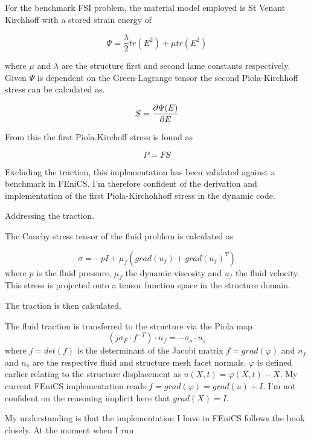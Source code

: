 \documentclass{article}
\begin{document}
For the benchmark FSI problem, the material model employed is St Venant Kirchhoff with a stored strain energy of 

\begin{equation}
\Psi = \frac{\lambda}{2} tr(E^2) + \mu tr(E^2) 
\end{equation}

where $\mu$ and $\lambda$ are the structure first and second lame constants respectively. Given $\Psi$ is dependent on the Green-Lagrange tensor the second Piola-Kirchhoff stress can be calculated as.

\begin{equation}
S = \frac{\partial \Psi (E)}{\partial E} 
\end{equation}

From this the first Piola-Kirchoff stress is found as

\begin{equation}
P = FS
\end{equation}

Excluding the traction, this implementation has been validated against a benchmark in FEniCS. I'm therefore confident of the derivation and implementation of the first Piola-Kirchohhoff stress in the dynamic code. 

Addressing the traction. 

The Cauchy stress tensor of the fluid problem is calculated as

\begin{equation}
\sigma = -p I + \mu_f (grad(u_f) + grad(u_f)^T )
\end{equation}
where $p$ is the fluid pressure, $\mu_f$ the dynamic viscosity and $u_f$ the fluid velocity. This stress is projected onto a tensor function space in the structure domain. 

The traction is then calculated.

The fluid traction is transferred to the structure via the Piola map
$$ (j \sigma_F \cdot f^{-T}) \cdot n_f = -\sigma_s \cdot n_s $$
where $j = det (f)$ is the determinant of the Jacobi matrix $f = grad(\varphi)$ and $n_f$ and $n_s$ are the respective fluid and structure mesh facet normals. $\varphi$ is defined earlier relating to the structure displacement as $u(X,t) = \varphi (X,t) - X$. My current FEniCS implementation reads $f = grad(\varphi) = grad(u)+ I$. 
I'm not confident on the reasoning implicit here that $grad(X) = I$. 

My understanding is that the implementation I have in FEniCS follows the book closely. At the moment when I run 

{}

\end{document}
